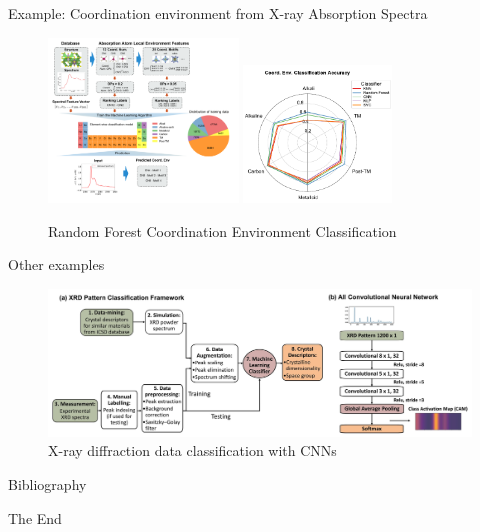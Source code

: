 \documentclass[aspectratio=169]{beamer}
\begin{document}
    \begin{frame}{Example: Coordination environment from X-ray Absorption Spectra}
        \begin{figure}
            \centering
            \includegraphics[width=0.45\textwidth]{figures/xasflowchart.pdf}
            \includegraphics[width=0.35\textwidth]{figures/xasaccuracy.pdf}
            \caption{Random Forest Coordination Environment Classification\cite{zhengRandomForestModels2020}}
        \end{figure}
    \end{frame}


    \begin{frame}{Other examples}
        \begin{figure}
            \centering
            \includegraphics[width=\textwidth]{figures/xrdclassification.png}
            \caption{X-ray diffraction data classification with CNNs\cite{oviedoFastInterpretableClassification2019}}
        \end{figure}
    \end{frame}

    \begin{frame}[allowframebreaks]{Bibliography}
        
        
    \end{frame}


    \begin{frame}
        \Huge{\centerline{The End}}
    \end{frame}
\end{document}
